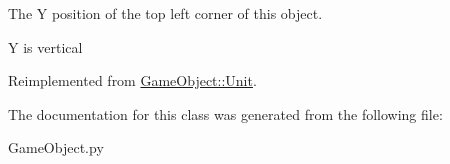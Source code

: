 The Y position of the top left corner of this object. 

Y is vertical 

Reimplemented from \hyperlink{classGameObject_1_1Unit_a4d0c47deb0ddb19b9e2b195d8ca2f2ad}{GameObject::Unit}.



The documentation for this class was generated from the following file:\begin{DoxyCompactItemize}
\item 
GameObject.py\end{DoxyCompactItemize}
